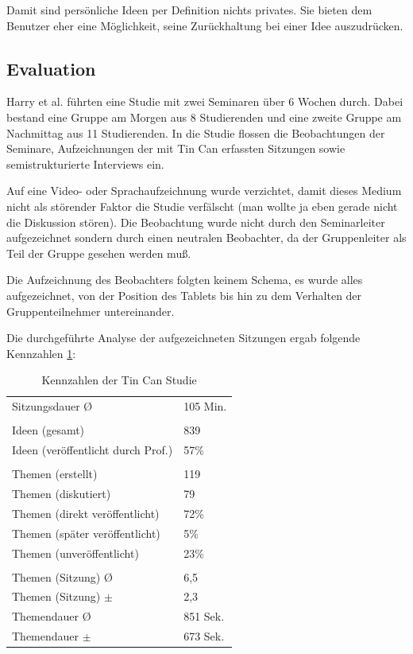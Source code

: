 Damit sind persönliche Ideen per Definition nichts privates. Sie bieten dem
Benutzer eher eine Möglichkeit, seine Zurückhaltung bei einer Idee auszudrücken.


\subsection{Evaluation}
Harry et al. \cite{HarGorSch2012} führten eine Studie mit zwei Seminaren über 6 Wochen durch. Dabei
bestand eine Gruppe am Morgen aus 8 Studierenden und eine zweite Gruppe am
Nachmittag aus 11 Studierenden. In die Studie flossen die Beobachtungen der
Seminare, Aufzeichnungen der mit Tin Can erfassten Sitzungen sowie
semistrukturierte Interviews ein.

Auf eine Video- oder Sprachaufzeichnung wurde verzichtet, damit dieses
Medium nicht als störender Faktor die Studie verfälscht (man wollte ja eben gerade
nicht die Diskussion stören). Die Beobachtung wurde nicht durch den
Seminarleiter aufgezeichnet sondern durch einen neutralen Beobachter, da der
Gruppenleiter als Teil der Gruppe gesehen werden muß.

Die Aufzeichnung des Beobachters folgten keinem Schema, es wurde alles
aufgezeichnet, von der Position des Tablets bis hin zu dem Verhalten der
Gruppenteilnehmer untereinander.

Die durchgeführte Analyse der aufgezeichneten Sitzungen ergab folgende Kennzahlen \ref{tincan_kennz}:

\begin{table}[htp]
  \begin{tabular}{ l  l }
    Sitzungsdauer \O & 105 Min.\\
    \\
    Ideen  (gesamt) &  839 \\
    Ideen  (veröffentlicht durch Prof.) & 57\% \\
    \\
    Themen (erstellt) & 119 \\
    Themen (diskutiert) & 79 \\
    Themen (direkt veröffentlicht) & 72\% \\
    Themen (später veröffentlicht) & 5\% \\ 
    Themen (unveröffentlicht) & 23\% \\
    \\
    Themen (Sitzung) \O & 6,5 \\
    Themen (Sitzung) $\pm$ & 2,3 \\
    Themendauer \O & 851 Sek. \\
    Themendauer $\pm$ & 673 Sek. \\
  \end{tabular}
  \caption{Kennzahlen der Tin Can Studie}
  \label{tincan_kennz}
\end{table}

